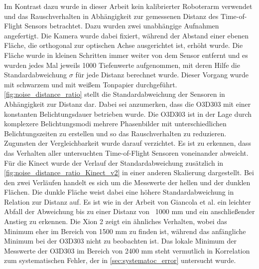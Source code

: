 \documentclass[thesis.tex]{subfiles}
\begin{document}
Im Kontrast dazu wurde in dieser Arbeit kein kalibrierter Roboterarm verwendet und das Rauschverhalten in Abhängigkeit zur gemessenen Distanz des Time-of-Flight Sensors betrachtet. Dazu wurden zwei unabhängige Aufnahmen angefertigt. Die Kamera wurde dabei fixiert, während der Abstand einer ebenen Fläche, die orthogonal zur optischen Achse ausgerichtet ist, erhöht wurde. Die Fläche wurde in kleinen Schritten immer weiter von dem Sensor entfernt und es wurden jedes Mal jeweils 1000 Tiefenwerte aufgenommen, mit deren Hilfe die Standardabweichung $\sigma$ für jede Distanz berechnet wurde. Dieser Vorgang wurde mit schwarzem und mit weißem Tonpapier durchgeführt. \autoref{fig:noise_distance_ratio} stellt die Standardabweichung der Sensoren in Abhängigkeit zur Distanz dar. Dabei sei anzumerken, dass die O3D303 mit einer konstanten Belichtungsdauer betrieben wurde. Die O3D303 ist in der Lage durch komplexere Belichtungsmodi mehrere Phasenbilder mit unterschiedlichen Belichtungszeiten zu erstellen und so das Rauschverhalten zu reduzieren. Zugunsten der Vergleichbarkeit wurde darauf verzichtet. Es ist zu erkennen, dass das Verhalten aller untersuchten Time-of-Flight Sensoren voneinander abweicht. Für die Kinect wurde der Verlauf der Standardabweichung zusätzlich in \autoref{fig:noise_distance_ratio_Kinect_v2} in einer anderen Skalierung dargestellt. Bei den zwei Verläufen handelt es sich um die Messwerte der hellen und der dunklen Flächen. Die dunkle Fläche weist dabei eine höhere Standardabweichung in Relation zur Distanz auf. Es ist wie in der Arbeit von Giancola et al. \cite{bib:Giancola2018} ein leichter Abfall der Abweichung bis zu einer Distanz von ~1000 mm und ein anschließender Anstieg zu erkennen. Die Xion 2 zeigt ein ähnliches Verhalten, wobei das Minimum eher im Bereich von 1500 mm zu finden ist, während das anfängliche Minimum bei der O3D303 nicht zu beobachten ist. Das lokale Minimum der Messwerte der O3D303 im Bereich von 2400 mm steht vermutlich in Korrelation zum systematischen Fehler, der in \autoref{sec:systematoc_error} untersucht wurde.
\end{document}
